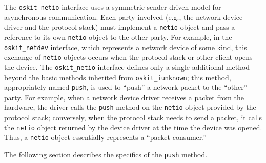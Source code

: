 The \texttt{oskit_netio} interface uses a symmetric sender-driven model
for asynchronous communication.
Each party involved
(e.g., the network device driver and the protocol stack)
must implement a \texttt{netio} object
and pass a reference to its own \texttt{netio} object to the other party.
For example,
in the \texttt{oskit_netdev} interface,
which represents a network device of some kind,
this exchange of \texttt{netio} objects occurs
when the protocol stack or other client opens the device.
The \texttt{oskit_netio} interface defines
only a single additional method
beyond the basic methods inherited from \texttt{oskit_iunknown};
this method, appropriately named \texttt{push},
is used to ``push'' a network packet to the ``other'' party.
For example, when a network device driver receives a packet from the hardware,
the driver calls the \texttt{push} method
on the \texttt{netio} object provided by the protocol stack;
conversely, when the protocol stack needs to send a packet,
it calls the \texttt{netio} object returned by the device driver
at the time the device was opened.
Thus, a \texttt{netio} object essentially represents a ``packet consumer.''

The following section describes the specifics of the \texttt{push} method.

